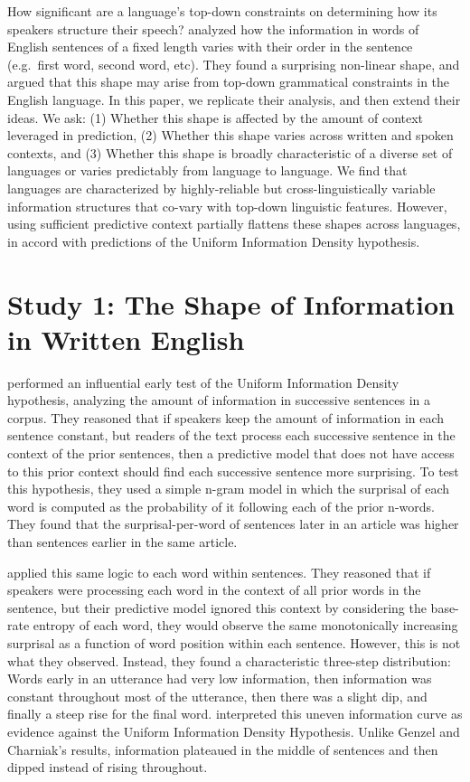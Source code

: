 \documentclass[entropy,article,submit,moreauthors,pdftex]{mdpi}
\begin{document}
How significant are a language's top-down constraints on determining how
its speakers structure their speech? \citet{yu2016} analyzed how the
information in words of English sentences of a fixed length varies with
their order in the sentence (e.g.~first word, second word, etc). They
found a surprising non-linear shape, and argued that this shape may
arise from top-down grammatical constraints in the English language. In
this paper, we replicate their analysis, and then extend their ideas. We
ask: (1) Whether this shape is affected by the amount of context
leveraged in prediction, (2) Whether this shape varies across written
and spoken contexts, and (3) Whether this shape is broadly
characteristic of a diverse set of languages or varies predictably from
language to language. We find that languages are characterized by
highly-reliable but cross-linguistically variable information structures
that co-vary with top-down linguistic features. However, using
sufficient predictive context partially flattens these shapes across
languages, in accord with predictions of the Uniform Information Density
hypothesis.

\hypertarget{study-1-the-shape-of-information-in-written-english}{%
\section{Study 1: The Shape of Information in Written
English}\label{study-1-the-shape-of-information-in-written-english}}

\citet{genzel2002} performed an influential early test of the Uniform
Information Density hypothesis, analyzing the amount of information in
successive sentences in a corpus. They reasoned that if speakers keep
the amount of information in each sentence constant, but readers of the
text process each successive sentence in the context of the prior
sentences, then a predictive model that does not have access to this
prior context should find each successive sentence more surprising. To
test this hypothesis, they used a simple n-gram model in which the
surprisal of each word is computed as the probability of it following
each of the prior n-words. They found that the surprisal-per-word of
sentences later in an article was higher than sentences earlier in the
same article.

\citet{yu2016} applied this same logic to each word within sentences.
They reasoned that if speakers were processing each word in the context
of all prior words in the sentence, but their predictive model ignored
this context by considering the base-rate entropy of each word, they
would observe the same monotonically increasing surprisal as a function
of word position within each sentence. However, this is not what they
observed. Instead, they found a characteristic three-step distribution:
Words early in an utterance had very low information, then information
was constant throughout most of the utterance, then there was a slight
dip, and finally a steep rise for the final word. \citet{yu2016}
interpreted this uneven information curve as evidence against the
Uniform Information Density Hypothesis. Unlike Genzel and Charniak's
results, information plateaued in the middle of sentences and then
dipped instead of rising throughout.
\end{document}
